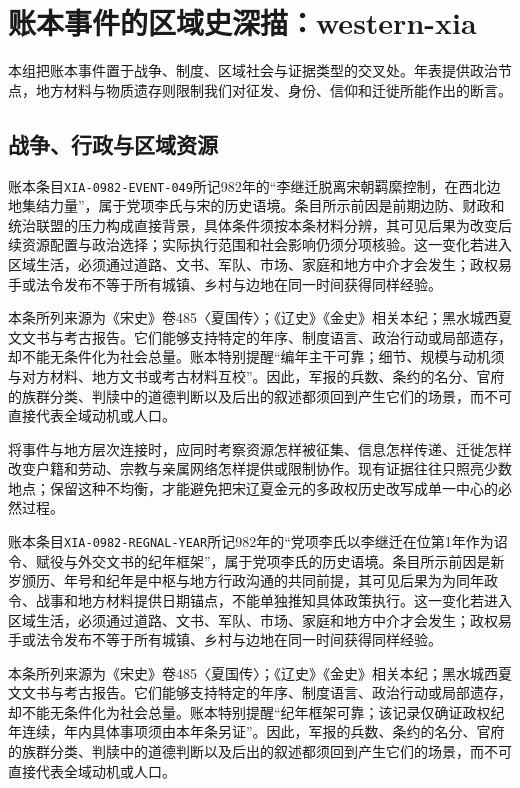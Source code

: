 \section{账本事件的区域史深描：western-xia}

\label{sec:ledger-depth-western-xia}

本组把账本事件置于战争、制度、区域社会与证据类型的交叉处。年表提供政治节点，地方材料与物质遗存则限制我们对征发、身份、信仰和迁徙所能作出的断言。

\subsection{战争、行政与区域资源}

账本条目\texttt{XIA-0982-EVENT-049}所记982年的“李继迁脱离宋朝羁縻控制，在西北边地集结力量”，属于党项李氏与宋的历史语境。条目所示前因是前期边防、财政和统治联盟的压力构成直接背景，具体条件须按本条材料分辨，其可见后果为改变后续资源配置与政治选择；实际执行范围和社会影响仍须分项核验。这一变化若进入区域生活，必须通过道路、文书、军队、市场、家庭和地方中介才会发生；政权易手或法令发布不等于所有城镇、乡村与边地在同一时间获得同样经验。

本条所列来源为《宋史》卷485〈夏国传〉；《辽史》《金史》相关本纪；黑水城西夏文文书与考古报告。它们能够支持特定的年序、制度语言、政治行动或局部遗存，却不能无条件化为社会总量。账本特别提醒“编年主干可靠；细节、规模与动机须与对方材料、地方文书或考古材料互校”。因此，军报的兵数、条约的名分、官府的族群分类、判牍中的道德判断以及后出的叙述都须回到产生它们的场景，而不可直接代表全域动机或人口。

将事件与地方层次连接时，应同时考察资源怎样被征集、信息怎样传递、迁徙怎样改变户籍和劳动、宗教与亲属网络怎样提供或限制协作。现有证据往往只照亮少数地点；保留这种不均衡，才能避免把宋辽夏金元的多政权历史改写成单一中心的必然过程。

账本条目\texttt{XIA-0982-REGNAL-YEAR}所记982年的“党项李氏以李继迁在位第1年作为诏令、赋役与外交文书的纪年框架”，属于党项李氏的历史语境。条目所示前因是新岁颁历、年号和纪年是中枢与地方行政沟通的共同前提，其可见后果为为同年政令、战事和地方材料提供日期锚点，不能单独推知具体政策执行。这一变化若进入区域生活，必须通过道路、文书、军队、市场、家庭和地方中介才会发生；政权易手或法令发布不等于所有城镇、乡村与边地在同一时间获得同样经验。

本条所列来源为《宋史》卷485〈夏国传〉；《辽史》《金史》相关本纪；黑水城西夏文文书与考古报告。它们能够支持特定的年序、制度语言、政治行动或局部遗存，却不能无条件化为社会总量。账本特别提醒“纪年框架可靠；该记录仅确证政权纪年连续，年内具体事项须由本年条另证”。因此，军报的兵数、条约的名分、官府的族群分类、判牍中的道德判断以及后出的叙述都须回到产生它们的场景，而不可直接代表全域动机或人口。

